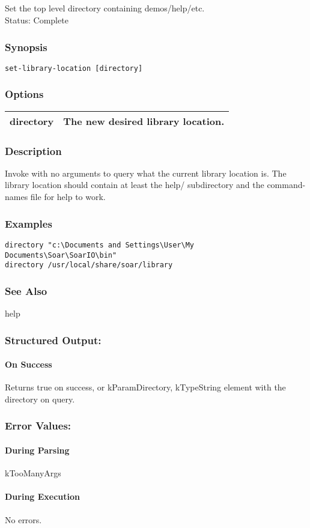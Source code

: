 \subsection{}
\label{set-library-location}
Set the top level directory containing demos/help/etc.\\ 
 Status: Complete
\subsubsection*{Synopsis}
\begin{verbatim}
set-library-location [directory] 
\end{verbatim}
\subsubsection*{Options}
\begin{tabular}{|l|l|}
\hline 
 directory  & The new desired library location.  \\
 \hline 
\end{tabular}
\subsubsection*{Description}
 Invoke with no arguments to query what the current library location is. The library location should contain at least the help/ subdirectory and the command-names file for help to work. 
\subsubsection*{Examples}
\begin{verbatim}
directory "c:\Documents and Settings\User\My Documents\Soar\SoarIO\bin"
directory /usr/local/share/soar/library
\end{verbatim}
\subsubsection*{See Also}
 help
\subsubsection*{Structured Output:}
\paragraph*{On Success}
 Returns true on success, or kParamDirectory, kTypeString element with the directory on query. 
\subsubsection*{Error Values:}
\paragraph*{During Parsing}
 kTooManyArgs
\paragraph*{During Execution}
 No errors. 
